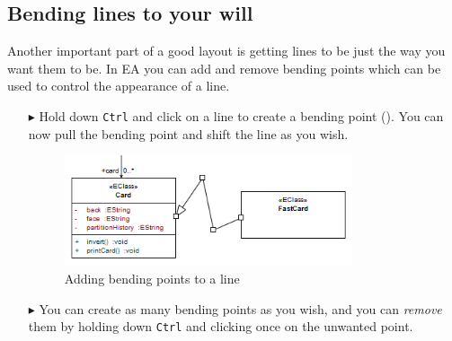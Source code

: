 \newpage

\subsection{Bending lines to your will}

Another important part of a good layout is getting lines to be just the way you want them to be. In EA you can add and remove bending points which can be used
to control the appearance of a line.

\begin{enumerate}
\item[$\blacktriangleright$]Hold down \texttt{Ctrl} and click on a line to create a bending point (). You can now pull the bending point
and shift the line as you wish.
 
\begin{figure}[htbp]
\begin{center}
  \includegraphics[width=0.8\textwidth]{ea_bendingLines}
  \caption{Adding bending points to a line}   
  \label{ea:bendLines}
\end{center}
\end{figure}

\item[$\blacktriangleright$] You can create as many bending points as you wish, and you can \emph{remove} them by holding down \texttt{Ctrl} and clicking once
on the unwanted point.
\end{enumerate}
